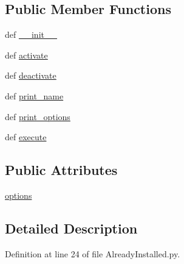 \subsection*{Public Member Functions}
\begin{DoxyCompactItemize}
\item 
def \hyperlink{class_already_installed_1_1_already_installed_ad412a2ca55660bde9d102ffffea5685f}{\-\_\-\-\_\-init\-\_\-\-\_\-}
\item 
def \hyperlink{class_already_installed_1_1_already_installed_aa69327b411af4bc2cd43f2bbf07cfe56}{activate}
\item 
def \hyperlink{class_already_installed_1_1_already_installed_a895aa66471ba8b5d4f67f8d17df5131c}{deactivate}
\item 
def \hyperlink{class_already_installed_1_1_already_installed_a63ce43492cf6c53f23a19a444109bfa8}{print\-\_\-name}
\item 
def \hyperlink{class_already_installed_1_1_already_installed_a8061d145324dbf058b17bc16579e9d5f}{print\-\_\-options}
\item 
def \hyperlink{class_already_installed_1_1_already_installed_af1afb26d21ce30a80e68c834245baeda}{execute}
\end{DoxyCompactItemize}
\subsection*{Public Attributes}
\begin{DoxyCompactItemize}
\item 
\hyperlink{class_already_installed_1_1_already_installed_af9247ff7a3b5dab409644868b7cc34e3}{options}
\end{DoxyCompactItemize}


\subsection{Detailed Description}


Definition at line 24 of file Already\-Installed.\-py.



